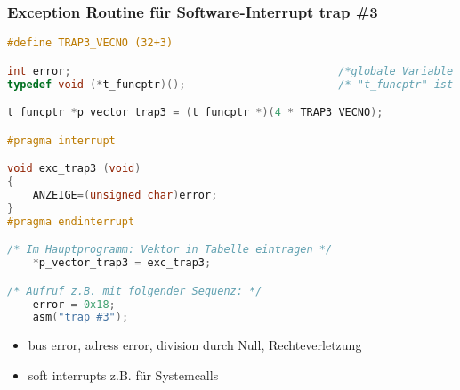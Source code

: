 \subsubsection{Exception Routine für Software-Interrupt trap \#3}

\begin{lstlisting}[language=C]
#define TRAP3_VECNO (32+3)

int error;                                          /*globale Variable fier Zugriff aus Exception Routine*/
typedef void (*t_funcptr)();                        /* "t_funcptr" ist ein Zeiger auf eine Funktion */

t_funcptr *p_vector_trap3 = (t_funcptr *)(4 * TRAP3_VECNO);

#pragma interrupt

void exc_trap3 (void)
{
	ANZEIGE=(unsigned char)error;
}
#pragma endinterrupt

/* Im Hauptprogramm: Vektor in Tabelle eintragen */
	*p_vector_trap3 = exc_trap3;

/* Aufruf z.B. mit folgender Sequenz: */
	error = 0x18;
	asm("trap #3");
\end{lstlisting}

\begin{itemize}
  \item bus error, adress error, division durch Null, Rechteverletzung
  \item soft interrupts z.B. für Systemcalls
\end{itemize}

